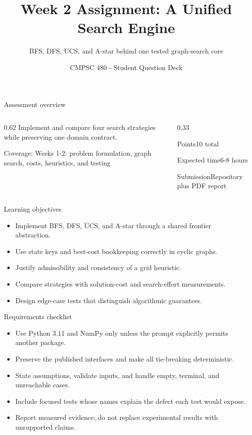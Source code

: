 \documentclass[aspectratio=169,11pt]{beamer}
\title[Week 2 Assignment Questions]{Week 2 Assignment: A Unified Search Engine}
\subtitle{BFS, DFS, UCS, and A-star behind one tested graph-search core}
\author{CMPSC 480 - Student Question Deck}
\date{}
\begin{document}
\begin{frame}
  \titlepage
\end{frame}

\begin{frame}{Assessment overview}
\begin{columns}[T,onlytextwidth]
\begin{column}{0.62\textwidth}
\Large Implement and compare four search strategies while preserving one domain contract.

\vspace{0.35cm}
\normalsize
Coverage: Weeks 1-2: problem formulation, graph search, costs, heuristics, and testing
\end{column}
\begin{column}{0.33\textwidth}
\begin{block}{Points}10 total\end{block}
\begin{block}{Expected time}6-8 hours\end{block}
\begin{block}{Submission}Repository plus PDF report\end{block}
\end{column}
\end{columns}
\end{frame}

\begin{frame}{Learning objectives}
\begin{itemize}
  \item Implement BFS, DFS, UCS, and A-star through a shared frontier abstraction.
  \item Use state keys and best-cost bookkeeping correctly in cyclic graphs.
  \item Justify admissibility and consistency of a grid heuristic.
  \item Compare strategies with solution-cost and search-effort measurements.
  \item Design edge-case tests that distinguish algorithmic guarantees.
\end{itemize}
\end{frame}

\begin{frame}{Requirements checklist}
\small
\begin{itemize}
  \item Use Python 3.11 and NumPy only unless the prompt explicitly permits another package.
  \item Preserve the published interfaces and make all tie-breaking deterministic.
  \item State assumptions, validate inputs, and handle empty, terminal, and unreachable cases.
  \item Include focused tests whose names explain the defect each test would expose.
  \item Report measured evidence; do not replace experimental results with unsupported claims.
\end{itemize}
\end{frame}
\end{document}
